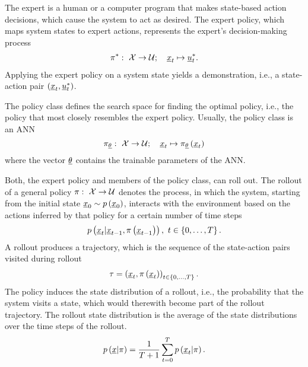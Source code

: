 
The expert 
is a human or a computer program 
that makes state-based action decisions,
which cause the system to act as desired.
The expert policy, which maps system states to expert actions, 
represents the expert's decision-making process
\begin{align}
    \pi^*
    :\ \mathcal{X} \rightarrow \mathcal{U}
    ;\quad 
    \underline{x}_t 
    \mapsto 
    \underline{u}_t^*
    .
\end{align}
Applying the expert policy on a system state
yields a demonstration,
i.e., a state-action pair 
$\left({\underline{x}_t, \underline{u}_t^*}\right)$.


The policy class defines the search space for
finding the optimal policy, i.e., 
the policy that most closely resembles the expert policy.
Usually, 
the policy class is an ANN
\begin{equation}
    \pi_{\underline{\theta}}
    :\ \mathcal{X} \rightarrow \mathcal{U}
    ;\quad \underline{x}_t \mapsto 
    \pi_{\underline{\theta}} \left({\underline{x}_t}\right)
\end{equation}
where the vector $\underline{\theta}$ 
contains the trainable parameters of the ANN.

Both, the expert policy 
and members of the policy class, can roll out.
The rollout of a general policy 
$\pi :\ \mathcal{X} \rightarrow \mathcal{U}$
denotes the process, 
in which the system, 
starting from the initial state 
$\underline{x}_0 \sim p \left({\underline{x}_0}\right)$,
interacts with the environment 
based on the actions inferred by that policy
for a certain number of time steps
\begin{align}
    p \left({
        \underline{x}_t | \underline{x}_{t -1}, \pi\left({\underline{x}_{t-1}}\right)
    }\right),\ t \in \left\{{0,\dots, T}\right\}.
\end{align}
A rollout produces a trajectory,
which is the sequence of the state-action pairs visited during rollout
\begin{align}
    \tau = \left({\underline{x}_t, 
    \pi\left({\underline{x}_t}\right)}\right)
    _{t \in \left\{{0, \dots, T}\right\}}.    
\end{align}
The policy induces the state distribution of a rollout, i.e., the probability that the system visits a state, which would therewith become part of the rollout trajectory. The rollout state distribution is the average of the state distributions over the time steps of the rollout.
\begin{equation}
    p \left({\underline{x} | \pi}\right)
    = \frac{1}{T+1} \sum_{t = 0}^T
    p \left({\underline{x}_t | \pi}\right).
\end{equation}


